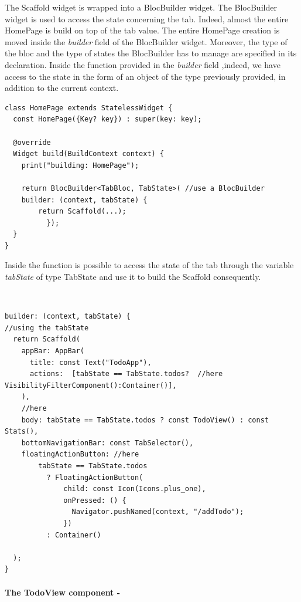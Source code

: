 The Scaffold widget is wrapped into a BlocBuilder widget. The BlocBuilder widget is used to access the state concerning the tab. Indeed, almost the entire HomePage is build on top of the tab value. The entire HomePage creation is moved inside the \textit{builder} field of the BlocBuilder widget. Moreover, the type of the bloc and the type of states the BlocBuilder has to manage are specified in its declaration. Inside the function provided in the \textit{builder} field ,indeed, we have access to the state in the form of an object of the type previously provided, in addition to the current context.
\begin{code}
\mbox{}
 \mbox{}
\label{code:2.14}
\begin{verbatim}
class HomePage extends StatelessWidget {
  const HomePage({Key? key}) : super(key: key);

  @override
  Widget build(BuildContext context) {
    print("building: HomePage");

    return BlocBuilder<TabBloc, TabState>( //use a BlocBuilder
    builder: (context, tabState) {
    	return Scaffold(...);
          });
  }
}
\end{verbatim}
\end{code}
Inside the function is possible to access the state of the tab through the variable \textit{tabState} of type TabState and use it to build the Scaffold consequently.
\begin{code}
\mbox{}\\
 \mbox{}
\label{code:2.14}
\begin{verbatim}
builder: (context, tabState) {
//using the tabState
  return Scaffold(
    appBar: AppBar(
      title: const Text("TodoApp"),
      actions:  [tabState == TabState.todos?  //here VisibilityFilterComponent():Container()],
    ),
    //here
    body: tabState == TabState.todos ? const TodoView() : const Stats(),
    bottomNavigationBar: const TabSelector(),
    floatingActionButton: //here
        tabState == TabState.todos
          ? FloatingActionButton(
              child: const Icon(Icons.plus_one),
              onPressed: () {
                Navigator.pushNamed(context, "/addTodo");
              })
          : Container()

  );
}
\end{verbatim}
\mbox{}
\end{code}
\paragraph{The TodoView component - }
\label{subpar:todo_app_bloc_core_state}

